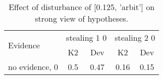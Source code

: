 \begin{table}\begin{tabular}{l|cc|cc}\toprule\multirow{2}{*}{Evidence} & \multicolumn{2}{c}{stealing 1 0}& \multicolumn{2}{c}{stealing 2 0}\\& {K2} & {Dev}& {K2} & {Dev}\\\midrule
no evidence, 0 & 0.5&0.47&0.16&0.15\\\bottomrule\end{tabular}\caption{Effect of disturbance of [0.125, 'arbit'] on strong view of hypotheses.}\end{table}